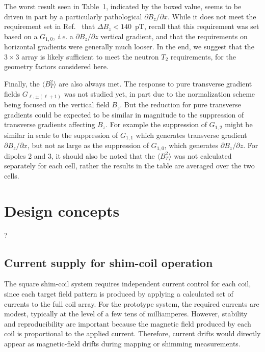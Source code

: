 \documentclass[preprint,12pt]{elsarticle}
\begin{document}
The worst result seen in Table~1, indicated by the boxed value, seems
to be driven in part by a particularly pathological $\partial
B_z/\partial x$.  While it does not meet the requirement set in
Ref.~\cite{bib:jeffnote} that $\Delta B_z<140$~pT, recall that this
requirement was set based on a $G_{1,0}$, {\it i.e.} a $\partial
B_z/\partial z$ vertical gradient, and that the requirements on
horizontal gradients were generally much looser.  In the end, we
suggest that the $3\times 3$ array is likely sufficient to meet the
neutron $T_2$ requirements, for the geometry factors considered here.

Finally, the $\langle B_T^2\rangle$ are also always met.  The response
to pure transverse gradient fields $G_{\ell,\pm(\ell+1)}$ was not
studied yet, in part due to the normalization scheme being focused on
the vertical field $B_z$.  But the reduction for pure transverse
gradients could be expected to be similar in magnitude to the
suppression of transverse gradients affecting $B_z$.  For example the
suppression of $G_{1,2}$ might be similar in scale to the suppression
of $G_{1,1}$ which generates transverse gradient $\partial
B_z/\partial x$, but not as large as the suppression of $G_{1,0}$,
which generates $\partial B_z/\partial z$.  For dipoles 2 and 3, it
should also be noted that the $\langle B_T^2\rangle$ was not
calculated separately for each cell, rather the results in the table
are averaged over the two cells.

\section{Design concepts}\label{sec3}

?

\subsection{Current supply for shim-coil operation}

The square shim-coil system requires independent current control for
each coil, since each target field pattern is produced by applying a
calculated set of currents to the full coil array. For the prototype
system, the required currents are modest, typically at the level of a
few tens of milliamperes. However, stability and reproducibility are
important because the magnetic field produced by each coil is
proportional to the applied current. Therefore, current drifts would
directly appear as magnetic-field drifts during mapping or shimming
measurements.
\end{document}
